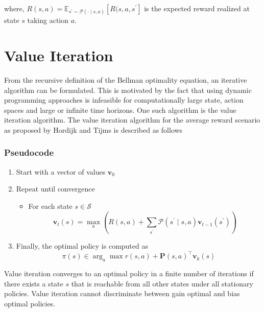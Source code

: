 where, $R(s,a) = \mathbb{E}_{s^\prime \sim \mathcal{P}(\cdot \mid s, a)}\left[ R(s, a, s^\prime \right]$ is the expected reward realized at state $s$ taking action $a$.

\section{Value Iteration}

From the recursive definition of the Bellman optimality equation, an iterative algorithm can be formulated. 
This is motivated by the fact that using dynamic programming approaches is infeasible for computationally large state, action spaces and large or infinite time horizons.
One such algorithm is the value iteration algorithm. The value iteration algorithm for the average reward scenario as proposed by Hordijk and Tijms \cite{hordijk_modified_1975} is described as follows

\subsubsection*{Pseudocode}
\begin{enumerate}
    \item Start with a vector of values $\mathbf{v}_0$
    \item Repeat until convergence 
    
    \begin{itemize}
        \item For each state $s \in \mathcal{S}$
        $$\mathbf{v}_t(s) = \max_a \left(R(s, a) + \sum_{s^\prime} \mathcal{P}(s^\prime \mid s, a) \mathbf{v}_{t-1}(s^\prime) \right)$$
    \end{itemize}
    
    
    \item Finally, the optimal policy is computed as
    $$\pi(s) \in \arg_a\max r(s,a) + \mathbf{P}(s,a)^\top \mathbf{v}_k(s) $$
    
\end{enumerate}

Value iteration converges to an optimal policy in a finite number of iterations if there exists a state $s$ that is reachable from all other states under all stationary policies.
Value iteration cannot discriminate between gain optimal and bias optimal policies.


